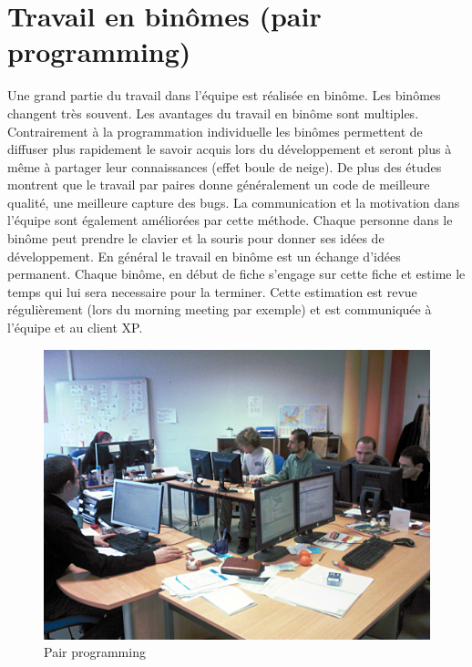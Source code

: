 \section{Travail en binômes (pair programming)}
Une grand partie du travail dans l'équipe est réalisée en binôme. Les binômes changent très souvent. Les avantages du travail en binôme sont multiples. Contrairement à la programmation individuelle les binômes permettent de diffuser plus rapidement le savoir acquis lors du développement et seront plus à même à partager leur connaissances (effet boule de neige). De plus des études montrent que le travail par paires donne généralement un code de meilleure qualité, une meilleure capture des bugs. La communication et la motivation dans l'équipe sont également améliorées par cette méthode. Chaque personne dans le binôme peut prendre le clavier et la souris pour donner ses idées de développement. En général le travail en binôme est un échange d'idées permanent. Chaque binôme, en début de fiche s'engage sur cette fiche et estime le temps qui lui sera necessaire pour la terminer. Cette estimation est revue régulièrement (lors du morning meeting par exemple) et est communiquée à l'équipe et au client XP.

\begin{figure}[!h]
\centering
\includegraphics[scale=0.15]{Illustrations/SP_A0188.jpg}
\caption{Pair programming}
\label{fig:Pair programming}
\end{figure}

